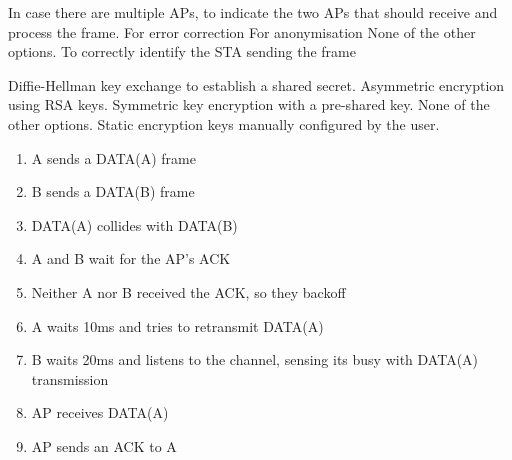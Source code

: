 \begin{questions}
    \begin{checkboxes}
        \choice In case there are multiple APs, to indicate the two APs that should receive and process the frame.
        \choice For error correction
        \choice For anonymisation
        \CorrectChoice None of the other options.
        \choice To correctly identify the STA sending the frame
    \end{checkboxes}

    \begin{checkboxes}
        \CorrectChoice Diffie-Hellman key exchange to establish a shared secret.
        \choice Asymmetric encryption using RSA keys.
        \choice Symmetric key encryption with a pre-shared key.
        \choice None of the other options.
        \choice Static encryption keys manually configured by the user.
    \end{checkboxes}

    \begin{solution}
        \begin{enumerate}
            \item A sends a DATA(A) frame
            \item B sends a DATA(B) frame
            \item DATA(A) collides with DATA(B)
            \item A and B wait for the AP's ACK
            \item Neither A nor B received the ACK, so they backoff
            \item A waits 10ms and tries to retransmit DATA(A)
            \item B waits 20ms and listens to the channel, sensing its busy with DATA(A) transmission
            \item AP receives DATA(A)
            \item AP sends an ACK to A
        \end{enumerate}
    \end{solution}


\end{questions}

